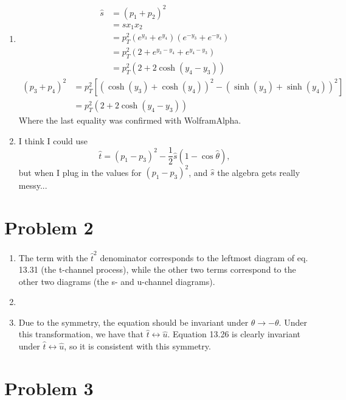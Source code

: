 \documentclass[12pt]{article}
\begin{document}
\begin{enumerate}[label=(\alph*)]
    \item
    \begin{align*}
        \hat{s} &= (p_1 + p_2)^2 \\
        &= s x_1 x_2 \\
        &= p_T^2\left(e^{y_3} + e^{y_4}\right)\left(e^{-y_3} + e^{-y_4}\right) \\
        &= p_T^2\left(2 + e^{y_3-y_4} + e^{y_4-y_3}\right) \\
        &= p_T^2\left(2 + 2\cosh(y_4 - y_3)\right)
    \end{align*}
    \begin{align*}
        (p_3 + p_4)^2 &= p_T^2\left[\left(\cosh(y_3) + \cosh(y_4)\right)^2 - \left(\sinh(y_3) + \sinh(y_4)\right)^2\right] \\
        &= p_T^2\left(2 + 2\cosh(y_4 - y_3)\right)
    \end{align*}
    Where the last equality was confirmed with WolframAlpha.

    \item I think I could use
    \[ \hat{t} = (p_1 - p_3)^2 -\frac{1}{2}\hat{s}(1 - \cos\hat{\theta}), \]
    but when I plug in the values for $(p_1 - p_3)^2$, and $\hat{s}$ the algebra gets really messy...
\end{enumerate}

\section*{Problem 2}
\begin{enumerate}[label=(\alph*)]
    \item The term with the $\hat{t}^2$ denominator corresponds to the leftmost diagram of eq. 13.31 (the t-channel process), while the other two terms correspond to the other two diagrams (the s- and u-channel diagrams).
    \item
    \item Due to the symmetry, the equation should be invariant under $\theta \to -\theta$. Under this transformation, we have that $\hat{t} \leftrightarrow \hat{u}$. Equation 13.26 is clearly invariant under $\hat{t} \leftrightarrow \hat{u}$, so it is consistent with this symmetry.
\end{enumerate}


\section*{Problem 3}
\end{document}
